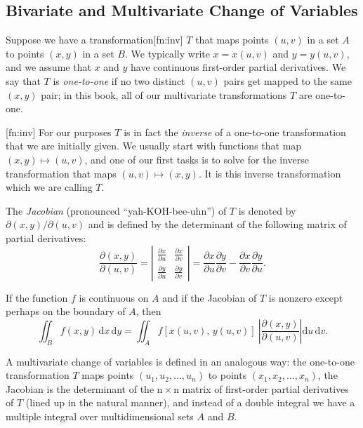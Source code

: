 \documentclass[captions=tableheading]{scrbook}
\begin{document}
\subsection{Bivariate and Multivariate Change of Variables}
\label{sec-6-6-4}

Suppose we have a transformation[fn:inv] $T$ that maps points $(u,v)$ in a set $A$ to points $(x,y)$ in a set $B$. We typically write $x=x(u,v)$ and $y=y(u,v)$, and we assume that $x$ and $y$ have continuous first-order partial derivatives. We say that $T$ is \emph{one-to-one} if no two distinct $(u,v)$ pairs get mapped to the same $(x,y)$ pair; in this book, all of our multivariate transformations $T$ are one-to-one.

[fn:inv] For our purposes $T$ is in fact the \emph{inverse} of a one-to-one transformation that we are initially given. We usually start with functions that map $(x,y) \longmapsto (u,v)$, and one of our first tasks is to solve for the inverse transformation that maps $(u,v)\longmapsto(x,y)$. It is this inverse transformation which we are calling $T$.

The \emph{Jacobian} (pronounced ``yah-KOH-bee-uhn'') of $T$ is denoted by $\partial(x,y)/\partial(u,v)$ and is defined by the determinant of the following matrix of partial derivatives:
\begin{equation}
\frac{\partial(x,y)}{\partial(u,v)}=\left|
\begin{array}{cc}
\frac{\partial x}{\partial u} & \frac{\partial x}{\partial v}\\
\frac{\partial y}{\partial u} & \frac{\partial y}{\partial v}
\end{array}
\right|=\frac{\partial x}{\partial u}\frac{\partial y}{\partial v}-\frac{\partial x}{\partial v}\frac{\partial y}{\partial u}.
\end{equation}

If the function $f$ is continuous on $A$ and if the Jacobian of $T$ is nonzero except perhaps on the boundary of $A$, then 
\begin{equation}
\iint_{B}f(x,y)\,\mathrm{d} x\,\mathrm{d} y=\iint_{A}f\left[x(u,v),\, y(u,v)\right]\ \left|\frac{\partial(x,y)}{\partial(u,v)}\right|\mathrm{d} u\,\mathrm{d} v.
\end{equation} 

A multivariate change of variables is defined in an analogous way: the one-to-one transformation $T$ maps points $(u_{1},u_{2},\ldots,u_{n})$ to points $(x_{1},x_{2},\ldots,x_{n})$, the Jacobian is the determinant of the $\mathrm{n}\times\mathrm{n}$ matrix of first-order partial derivatives of $T$ (lined up in the natural manner), and instead of a double integral we have a multiple integral over multidimensional sets $A$ and $B$.
\end{document}
